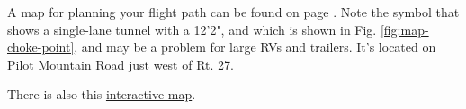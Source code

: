 A map for planning your flight path can be found on page \pageref{image:overviewmap}.  Note the  \faWarning\xspace symbol that shows a single-lane tunnel with a 12'2", and which is shown in Fig. \ref{fig:map-choke-point}, and may be a problem for large RVs and trailers.  It's located on \href{https://goo.gl/maps/gRTxhTscssnCBaJF7}{Pilot Mountain Road just west of Rt. 27}.

There is also this  \href{https://www.google.com/maps/d/edit?mid=1sFKp9jwvp5uYlfj9xXA-Ky0LvaTCU88&usp=sharing}{interactive map}.




